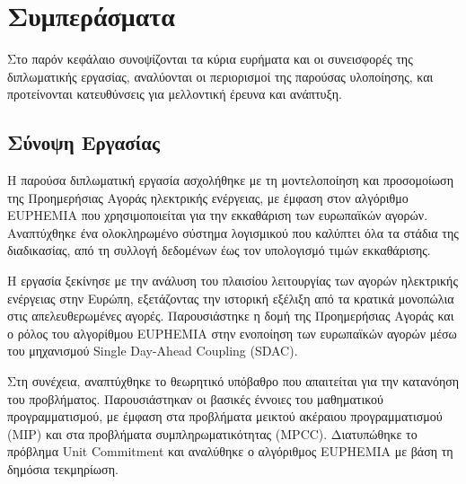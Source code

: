% 

\chapter{Συμπεράσματα}
\label{ch:conclusions}

Στο παρόν κεφάλαιο συνοψίζονται τα κύρια ευρήματα και οι συνεισφορές της διπλωματικής εργασίας, αναλύονται οι περιορισμοί της παρούσας υλοποίησης, και προτείνονται κατευθύνσεις για μελλοντική έρευνα και ανάπτυξη.


\section{Σύνοψη Εργασίας}
\label{sec:thesis-summary}

Η παρούσα διπλωματική εργασία ασχολήθηκε με τη μοντελοποίηση και προσομοίωση της Προημερήσιας Αγοράς ηλεκτρικής ενέργειας, με έμφαση στον αλγόριθμο EUPHEMIA που χρησιμοποιείται για την εκκαθάριση των ευρωπαϊκών αγορών. Αναπτύχθηκε ένα ολοκληρωμένο σύστημα λογισμικού που καλύπτει όλα τα στάδια της διαδικασίας, από τη συλλογή δεδομένων έως τον υπολογισμό τιμών εκκαθάρισης.

Η εργασία ξεκίνησε με την ανάλυση του πλαισίου λειτουργίας των αγορών ηλεκτρικής ενέργειας στην Ευρώπη, εξετάζοντας την ιστορική εξέλιξη από τα κρατικά μονοπώλια στις απελευθερωμένες αγορές. Παρουσιάστηκε η δομή της Προημερήσιας Αγοράς και ο ρόλος του αλγορίθμου EUPHEMIA στην ενοποίηση των ευρωπαϊκών αγορών μέσω του μηχανισμού Single Day-Ahead Coupling (SDAC).

Στη συνέχεια, αναπτύχθηκε το θεωρητικό υπόβαθρο που απαιτείται για την κατανόηση του προβλήματος. Παρουσιάστηκαν οι βασικές έννοιες του μαθηματικού προγραμματισμού, με έμφαση στα προβλήματα μεικτού ακέραιου προγραμματισμού (MIP) και στα προβλήματα συμπληρωματικότητας (MPCC). Διατυπώθηκε το πρόβλημα Unit Commitment και αναλύθηκε ο αλγόριθμος EUPHEMIA με βάση τη δημόσια τεκμηρίωση.

